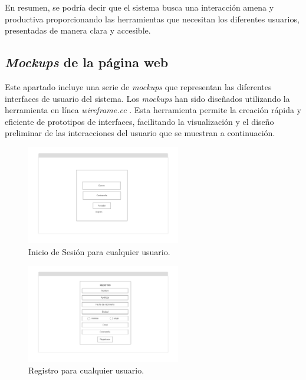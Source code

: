 En resumen, se podría decir que el sistema busca una interacción amena y productiva proporcionando las herramientas que necesitan los diferentes usuarios, presentadas de manera clara y accesible.

\subsection{\textit{Mockups} de la página web}

Este apartado incluye una serie de \textit{mockups} que representan las diferentes interfaces de usuario del sistema. Los \textit{mockups} han sido diseñados utilizando la herramienta en línea \textit{wireframe.cc} \cite{wireframe}. Esta herramienta permite la creación rápida y eficiente de prototipos de interfaces, facilitando la visualización y el diseño preliminar de las interacciones del usuario que se muestran a continuación.

\begin{figure}[H]
    \centering
    \includegraphics[width=0.6\textwidth]{imagenes/Mockups/1-InicioDeSesion.png}
    \caption{Inicio de Sesión para cualquier usuario.}
\end{figure}

\begin{figure}[H]
    \centering
    \includegraphics[width=0.6\textwidth]{imagenes/Mockups/2-Registro.png}
    \caption{Registro para cualquier usuario.}
\end{figure}

